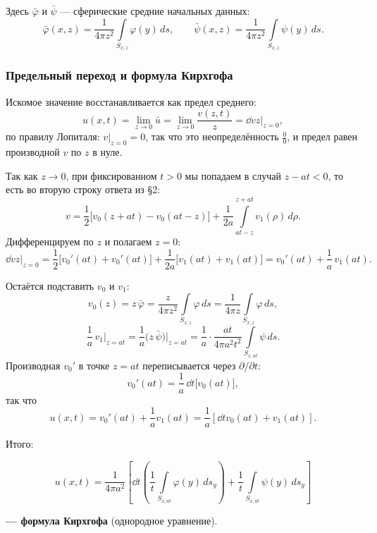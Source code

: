 Здесь $\bar\varphi$ и $\bar\psi$ — сферические средние начальных данных:
\[
  \bar\varphi(x,z) = \frac{1}{4\pi z^2} \int\limits_{S_{x,z}} \varphi(y)\, ds,
  \qquad
  \bar\psi(x,z) = \frac{1}{4\pi z^2} \int\limits_{S_{x,z}} \psi(y)\, ds .
\]

\subsubsection*{Предельный переход и формула Кирхгофа}

Искомое значение восстанавливается как предел среднего:
\[
  u(x,t) = \lim_{z \to 0} \bar u = \lim_{z \to 0} \frac{v(z,t)}{z}
         = \dd{v}{z}\bigg|_{z=0} ,
\]
по правилу Лопиталя: $v|_{z=0} = 0$, так что это неопределённость
$\tfrac{0}{0}$, и предел равен производной $v$ по $z$ в нуле.

Так как $z \to 0$, при фиксированном $t > 0$ мы попадаем в случай $z - at < 0$,
то есть во вторую строку ответа из \S2:
\[
  v = \frac12\Big[v_0(z+at) - v_0(at-z)\Big]
    + \frac{1}{2a}\int\limits_{at-z}^{z+at} v_1(\rho)\, d\rho .
\]
Дифференцируем по $z$ и полагаем $z = 0$:
\[
  \dd{v}{z}\bigg|_{z=0}
  = \frac12\Big[v_0'(at) + v_0'(at)\Big]
    + \frac{1}{2a}\Big[v_1(at) + v_1(at)\Big]
  = v_0'(at) + \frac1a\, v_1(at) .
\]

Остаётся подставить $v_0$ и $v_1$:
\[
  v_0(z) = z\,\bar\varphi = \frac{z}{4\pi z^2} \int\limits_{S_{x,z}} \varphi\, ds
         = \frac{1}{4\pi z} \int\limits_{S_{x,z}} \varphi\, ds ,
\]
\[
  \frac1a\, v_1\big|_{z=at} = \frac1a \big(z\,\bar\psi\big)\Big|_{z=at}
  = \frac1a \cdot \frac{at}{4\pi a^2 t^2} \int\limits_{S_{x,at}} \psi\, ds .
\]
Производная $v_0'$ в точке $z = at$ переписывается через $\partial/\partial t$:
\[
  v_0'(at) = \frac1a\, \dd{}{t}\Big[v_0(at)\Big] ,
\]
так что
\[
  u(x,t) = v_0'(at) + \frac1a v_1(at)
         = \frac1a\left[\dd{}{t} v_0(at) + v_1(at)\right] .
\]

Итого:

\begin{equation}\tag{К}\label{eq:kirchhoff-free}
  \boxed{\ u(x,t) = \frac{1}{4\pi a^2}\left[
    \dd{}{t}\left(\frac1t \int\limits_{S_{x,at}} \varphi(y)\, ds_y\right)
    + \frac1t \int\limits_{S_{x,at}} \psi(y)\, ds_y
  \right]\ }
\end{equation}

\begin{center}
\textbf{— формула Кирхгофа} (однородное уравнение).
\end{center}

